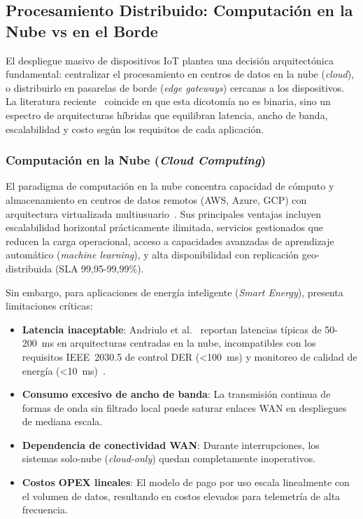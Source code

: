 
\subsection{Procesamiento Distribuido: Computación en la Nube vs en el Borde}
\label{sec:edge-vs-cloud}

El despliegue masivo de dispositivos IoT plantea una decisión arquitectónica fundamental: centralizar el procesamiento en centros de datos en la nube (\textit{cloud}), o distribuirlo en pasarelas de borde (\textit{edge gateways}) cercanas a los dispositivos. La literatura reciente~\cite{andriuloEdgeComputingCloud2024,minhEdgeComputingIoTEnabled2022} coincide en que esta dicotomía no es binaria, sino un espectro de arquitecturas híbridas que equilibran latencia, ancho de banda, escalabilidad y costo según los requisitos de cada aplicación.

\subsubsection{Computación en la Nube (\textit{Cloud Computing})}

El paradigma de computación en la nube concentra capacidad de cómputo y almacenamiento en centros de datos remotos (AWS, Azure, GCP) con arquitectura virtualizada multiusuario~\cite{andriuloEdgeComputingCloud2024}. Sus principales ventajas incluyen escalabilidad horizontal prácticamente ilimitada, servicios gestionados que reducen la carga operacional, acceso a capacidades avanzadas de aprendizaje automático (\textit{machine learning}), y alta disponibilidad con replicación geo-distribuida (SLA 99,95-99,99\%).

Sin embargo, para aplicaciones de energía inteligente (\textit{Smart Energy}), presenta limitaciones críticas:

\begin{itemize}
\item \textbf{Latencia inaceptable}: Andriulo et al.~\cite{andriuloEdgeComputingCloud2024} reportan latencias típicas de 50-200~ms en arquitecturas centradas en la nube, incompatibles con los requisitos IEEE~2030.5 de control DER (<100~ms) y monitoreo de calidad de energía (<10~ms)~\cite{IEEERecommendedPractice}.
\item \textbf{Consumo excesivo de ancho de banda}: La transmisión continua de formas de onda sin filtrado local puede saturar enlaces WAN en despliegues de mediana escala.
\item \textbf{Dependencia de conectividad WAN}: Durante interrupciones, los sistemas solo-nube (\textit{cloud-only}) quedan completamente inoperativos.
\item \textbf{Costos OPEX lineales}: El modelo de pago por uso escala linealmente con el volumen de datos, resultando en costos elevados para telemetría de alta frecuencia.
\end{itemize}

